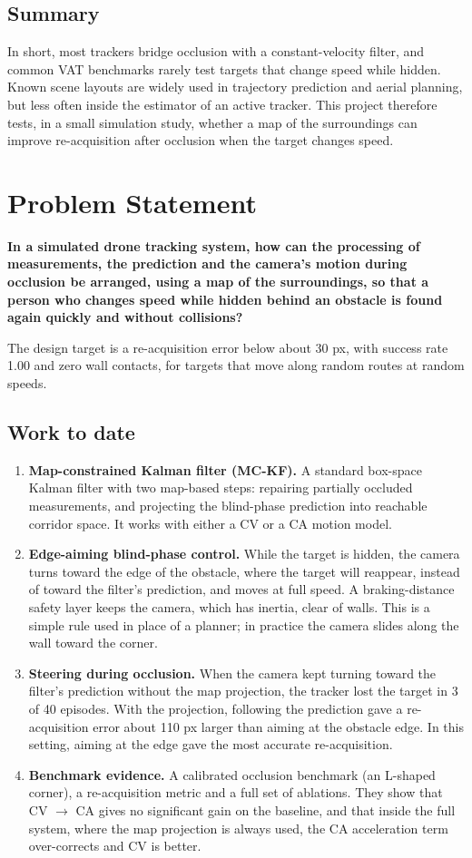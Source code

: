 \documentclass[12pt,a4paper]{article}
\begin{document}
\subsection{Summary}
In short, most trackers bridge occlusion with a constant-velocity filter, and common VAT benchmarks rarely test targets that change speed while hidden.
Known scene layouts are widely used in trajectory prediction and aerial planning, but less often inside the estimator of an active tracker.
This project therefore tests, in a small simulation study, whether a map of the surroundings can improve re-acquisition after occlusion when the target changes speed.

\section{Problem Statement}
\textbf{In a simulated drone tracking system, how can the processing of measurements, the prediction and the camera's motion during occlusion be arranged, using a map of the surroundings, so that a person who changes speed while hidden behind an obstacle is found again quickly and without collisions?}

The design target is a re-acquisition error below about 30 px, with success rate 1.00 and zero wall contacts, for targets that move along random routes at random speeds.

\subsection{Work to date}
\begin{enumerate}[label=\textbf{C\arabic*.}]
  \item \textbf{Map-constrained Kalman filter (MC-KF).} A standard box-space Kalman filter with two map-based steps: repairing partially occluded measurements, and projecting the blind-phase prediction into reachable corridor space. It works with either a CV or a CA motion model.
  \item \textbf{Edge-aiming blind-phase control.} While the target is hidden, the camera turns toward the edge of the obstacle, where the target will reappear, instead of toward the filter's prediction, and moves at full speed. A braking-distance safety layer keeps the camera, which has inertia, clear of walls. This is a simple rule used in place of a planner; in practice the camera slides along the wall toward the corner.
  \item \textbf{Steering during occlusion.} When the camera kept turning toward the filter's prediction without the map projection, the tracker lost the target in 3 of 40 episodes. With the projection, following the prediction gave a re-acquisition error about 110 px larger than aiming at the obstacle edge. In this setting, aiming at the edge gave the most accurate re-acquisition.
  \item \textbf{Benchmark evidence.} A calibrated occlusion benchmark (an L-shaped corner), a re-acquisition metric and a full set of ablations. They show that CV $\rightarrow$ CA gives no significant gain on the baseline, and that inside the full system, where the map projection is always used, the CA acceleration term over-corrects and CV is better.
\end{enumerate}
\end{document}
